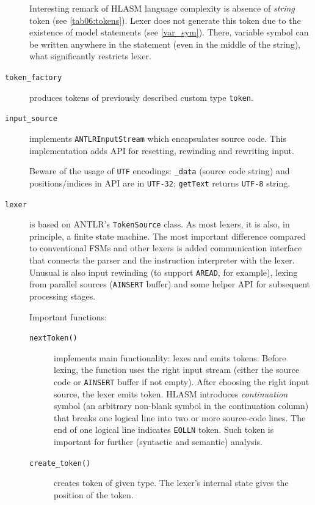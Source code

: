 \begin{description}
	Interesting remark of HLASM language complexity is absence of \emph{string} token (see \cref{tab06:tokens}). Lexer does not generate this token due to the existence of model statements (see \cref{var_sym}). There, variable symbol can be written anywhere in the statement (even in the middle of the string), what significantly restricts lexer.
	
	\item[\texttt{token\_factory}] produces tokens of previously described custom type \texttt{token}.
	
	\item[\texttt{input\_source}] implements \texttt{ANTLRInputStream} which encapsulates source code. This implementation adds API for resetting, rewinding and rewriting input. 
	
	Beware of the usage of \texttt{UTF} encodings: \texttt{\_data} (source code string) and positions/indices in API are in \texttt{UTF-32}; \texttt{getText} returns \texttt{UTF-8} string.
	
	\item[\texttt{lexer}] is based on ANTLR's \texttt{TokenSource} class. As most lexers, it is also, in principle, a finite state machine. The most important difference compared to conventional FSMs and other lexers is added communication interface that connects the parser and the instruction interpreter with the lexer. Unusual is also input rewinding (to support \texttt{AREAD}, for example), lexing from parallel sources (\texttt{AINSERT} buffer) and some helper API for subsequent processing stages.
	
	Important functions:
	
	\begin{description}
		\item[\texttt{nextToken()}] implements main functionality: lexes and emits tokens. Before lexing, the function uses the right input stream (either the source code or \texttt{AINSERT} buffer if not empty). After choosing the right input source, the lexer emits token. HLASM introduces \textit{continuation} symbol (an arbitrary non-blank symbol in the continuation column) that breaks one logical line into two or more source-code lines. The end of one logical line indicates \texttt{EOLLN} token. Such token is important for further (syntactic and semantic) analysis.
		
		
		\item[\texttt{create\_token()}] creates token of given type. The lexer's internal state gives the position of the token. 
		

\end{description}
\end{description}
